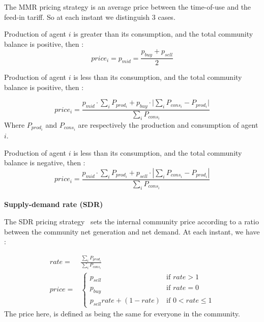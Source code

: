 \documentclass[12pt,a4paper]{article}
\begin{document}
The MMR pricing strategy \cite{article_1} is an average price between
the time-of-use and the feed-in tariff. So at each instant we distinguish 3 cases. 


Production of agent $i$ is greater than its consumption, and the total community balance is positive, then : 
\begin{equation}
    price_{i} = p_{mid} = \frac{p_{buy}+p_{sell}}{2} \nonumber
\end{equation} 

Production of agent $i$ is less than its consumption, and the total community balance is positive, then : 

\begin{equation}
    price_{i} = \frac{p_{mid} \cdot \sum_{i}{P_{prod_i}} + p_{buy} \cdot |\sum_{i}{P_{cons_i} - P_{prod_i}|}}{\sum_i{P_{cons_i}}} \nonumber
\end{equation}
Where $P_{prod_i}$ and $P_{cons_i}$ are respectively the production and consumption of agent $i$.

Production of agent $i$ is less than its consumption, and the total community balance is negative, then :
\begin{equation}
    price_{i} = \frac{p_{mid} \cdot \sum_{i}{P_{prod_i}} + p_{sell} \cdot |\sum_{i}{P_{cons_i} - P_{prod_i}}|}{\sum_i{P_{cons_i}}} \nonumber
\end{equation}
\\

\noindent\textbf{Supply-demand rate (SDR)}

The SDR pricing strategy \cite{article_1} sets the internal community price according to a ratio between the community net generation and net demand. At each instant, we have :

\begin{eqnarray}
    rate =& \frac{\sum_i{P_{prod_i}}}{\sum_i{P_{cons_i}}} \nonumber \\
    price =& \begin{cases}
        p_{sell} & \text{if } rate > 1 \\
        p_{buy} & \text{if } rate=0 \\
        p_{sell} rate + (1- rate) & \text{if } 0 < rate \leq 1    
    \end{cases} \nonumber 
\end{eqnarray}
The price here, is defined as being the same for everyone in the community.
\\
\end{document}

